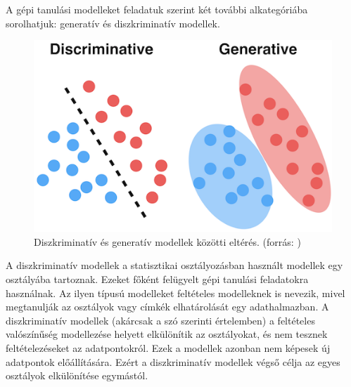 


A gépi tanulási modelleket feladatuk szerint két további alkategóriába sorolhatjuk: generatív és diszkriminatív modellek. 

\begin{figure}[h]
	\centering
	\includegraphics[width=0.65\columnwidth]{figures/generative_discriminative.png}
	\caption{Diszkriminatív és generatív modellek közötti eltérés. (forrás: \cite{fig:generative_discriminative})}
\end{figure}

A diszkriminatív modellek a statisztikai osztályozásban használt modellek egy osztályába tartoznak. Ezeket főként felügyelt gépi tanulási feladatokra használnak. Az ilyen típusú modelleket feltételes modelleknek is nevezik, mivel megtanulják az osztályok vagy címkék elhatárolását egy adathalmazban. A diszkriminatív modellek (akárcsak a szó szerinti értelemben) a feltételes valószínűség modellezése helyett elkülönítik az osztályokat, és nem tesznek feltételezéseket az adatpontokról. Ezek a modellek azonban nem képesek új adatpontok előállítására. Ezért a diszkriminatív modellek végső célja az egyes osztályok elkülönítése egymástól.

